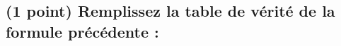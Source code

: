 \documentclass[11pt,a4paper]{article}
\begin{document}

\bigskip
\bigskip

\bigskip


\subsection{(1 point) Remplissez la table de vérité de la formule précédente : }

\medskip

\end{document}
